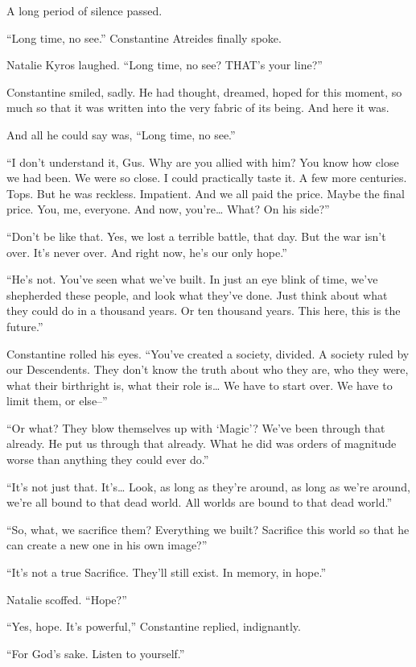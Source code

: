 A long period of silence passed.

“Long time, no see.” Constantine Atreides finally spoke.

Natalie Kyros laughed. “Long time, no see? THAT’s your line?”

Constantine smiled, sadly. He had thought, dreamed, hoped for this moment, so much so that it was written into the very fabric of its being. And here it was.

And all he could say was, “Long time, no see.”

“I don’t understand it, Gus. Why are you allied with him? You know how close we had been. We were so close. I could practically taste it. A few more centuries. Tops. But he was reckless. Impatient. And we all paid the price. Maybe the final price. You, me, everyone. And now, you’re… What? On his side?”

“Don’t be like that. Yes, we lost a terrible battle, that day. But the war isn’t over. It’s never over. And right now, he’s our only hope.”

“He’s not. You’ve seen what we’ve built. In just an eye blink of time, we’ve shepherded these people, and look what they’ve done. Just think about what they could do in a thousand years. Or ten thousand years. This here, this is the future.”

Constantine rolled his eyes. “You’ve created a society, divided. A society ruled by our Descendents. They don’t know the truth about who they are, who they were, what their birthright is, what their role is… We have to start over. We have to limit them, or else–”

“Or what? They blow themselves up with ‘Magic’? We’ve been through that already. He put us through that already. What he did was orders of magnitude worse than anything they could ever do.”

“It’s not just that. It’s… Look, as long as they’re around, as long as we’re around, we’re all bound to that dead world. All worlds are bound to that dead world.”

“So, what, we sacrifice them? Everything we built? Sacrifice this world so that he can create a new one in his own image?”

“It’s not a true Sacrifice. They’ll still exist. In memory, in hope.”

Natalie scoffed. “Hope?”

“Yes, hope. It’s powerful,” Constantine replied, indignantly.

“For God’s sake. Listen to yourself.”

